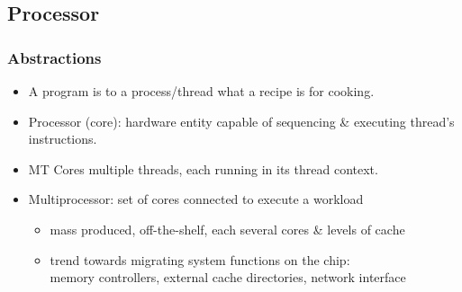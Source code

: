 \documentclass{beamer}
\newcommand{\emp}[1]{\textcolor{DikuRed}{ #1}}
\begin{document}
\begin{frame}[fragile]
	\tableofcontents[currentsection]
\end{frame}

\subsection{Processor}

\begin{frame}[fragile,t]
\frametitle{Abstractions}
\medskip

\begin{itemize}
    \item A \emp{program} is to a \emp{process/thread} 
            what a recipe is for cooking.\smallskip

    \item \emp{Processor (core)}: hardware entity capable of
            sequencing \& executing thread's instructions.\smallskip

    \item \emp{MT Cores} multiple threads, each 
            running in its thread context.\smallskip

    \item \emp{Multiprocessor:} set of cores connected to execute a workload
        \begin{itemize}
            \item mass produced, off-the-shelf, each several cores \& levels of cache
            \item trend towards migrating system functions on the chip:\\
                    memory controllers, external cache directories, network interface
        \end  {itemize}
\end{itemize}


\end{frame}
\end{document}
